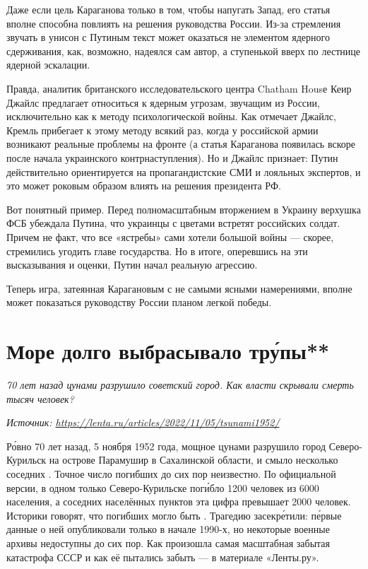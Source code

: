 Даже если цель Караганова только в том, чтобы напугать Запад, его статья вполне способна повлиять на решения руководства России. Из-за стремления звучать в унисон с Путиным текст может оказаться не элементом ядерного сдерживания, как, возможно, надеялся сам автор, а ступенькой вверх по лестнице ядерной эскалации.

Правда, аналитик британского исследовательского центра Chatham Housе Кеир Джайлс предлагает относиться к ядерным угрозам, звучащим из России, исключительно как к методу психологической войны. Как отмечает Джайлс, Кремль прибегает к этому методу всякий раз, когда у российской армии возникают реальные проблемы на фронте (а статья Караганова появилась вскоре после начала украинского контрнаступления). Но и Джайлс признает: Путин действительно ориентируется на пропагандистские СМИ и лояльных экспертов, и это может роковым образом влиять на решения президента РФ.

Вот понятный пример. Перед полномасштабным вторжением в Украину верхушка ФСБ убеждала Путина, что украинцы с цветами встретят российских солдат. Причем не факт, что все «ястребы» сами хотели большой войны — скорее, стремились угодить главе государства. Но в итоге, оперевшись на эти высказывания и оценки, Путин начал реальную агрессию.

Теперь игра, затеянная Карагановым с не самыми ясными намерениями, вполне может показаться руководству России планом легкой победы.


\clearpage


\section{Море долго выбрасывало тр\'{у}пы**}

\textit{70 лет назад цунами разрушило советский город. Как власти скрывали смерть тысяч человек?}

\textit{Источник: \url{https://lenta.ru/articles/2022/11/05/tsunami1952/}}

Р\'{о}вно 70 лет назад, 5 ноября 1952 года, мощное цунами разрушило город Северо-Курильск на острове Парамушир в Сахалинской области, и смыло несколько соседних . Точное число погибших до сих пор неизвестно. По официальной версии, в одном только Северо-Курильске пог\'{и}бло 1200 человек из 6000 населения, а  соседних населённых пунктов эта цифра превышает 2000 человек. Историки говорят, что погибших могло быть . Трагедию засекр\'{е}тили: п\'{е}рвые данные о ней опубликовали только в начале 1990-х, но некоторые военные архивы недоступны до сих пор. Как произошла самая масштабная забытая катастрофа СССР и как её пытались забыть --- в материале «Ленты.ру».

